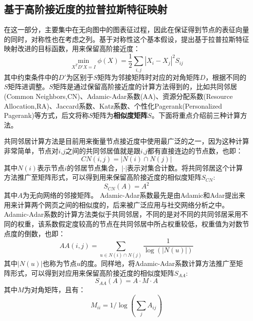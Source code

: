 \subsection{基于高阶接近度的拉普拉斯特征映射}
在这一部分，主要集中在无向图中的图表征过程，因此在保证得到节点的表征向量的同时，对称性也在考虑之列。基于对称性这个基本假设，提出基于拉普拉斯特征映射改进的目标函数，用来保留高阶接近度：
\begin{equation}\label{high_order_condition}
	\min_{X^TD'X=I} \phi(X) = \frac{1}{2}\sum_{i,j}|X_i - X_j|^2S_{ij} 
\end{equation}
其中约束条件中的$D'$为区别于$S$矩阵为邻接矩阵时对应的对角矩阵$D$，根据不同的$S$矩阵进调整。$S$矩阵是通过保留高阶接近度的计算方法得到的，比如共同邻居(Common Neighbors,CN)\cite{newman2001clustering}、Adamic-Adar系数(AA)\cite{adamic2003friends}、资源分配系数(Resource Allocation,RA)\cite{zhou2009predicting}、Jaccard系数、Katz系数、个性化Pagerank(Personalized Pagerank)\cite{wang2015link}等方式，后文将称$S$矩阵为\textbf{相似度矩阵$S$}。下面将重点介绍前三种计算方法。

共同邻居计算方法是目前用来衡量节点接近度中使用最广泛的之一，因为这种计算非常简单，节点对$i$,$j$之间的共同邻居值就是跟$i$,$j$都有直接连边的节点数，也即：
\begin{equation}
	CN(i,j) = |N(i) \cap N(j)|
\end{equation}
其中$N(i)$表示节点$i$的邻居节点集合，$|\cdot|$表示对集合计数。将共同邻居这个计算方法推广至矩阵形式，可以得到用来保留高阶接近度的相似度矩阵$S_{CN}$:
\begin{equation}
	S_{CN}(A) = A^2
\end{equation}
其中$A$为无向网络的邻接矩阵。
Adamic-Adar系数最先是由Adamic和Adar提出来用来计算两个网页之间的相似度的，后来被广泛应用与社交网络分析之中。Adamic-Adar系数的计算方法类似于共同邻居，不同的是对不同的共同邻居采用不同的权重，该系数假定度较高的节点在共同邻居中所占权重较低，权重值为对数节点度的倒数，也即：
\begin{equation}
	AA(i,j) = \sum_{u \in N(i)\cap N(j)} \frac{1}{\log(|N(u)|)}
\end{equation}
其中$|N(u)|$也称为节点$u$的度。同样地，将Adamic-Adar系数计算方法推广至矩阵形式，可以得到对应用来保留高阶接近度的相似度矩阵$S_{AA}$:
\begin{equation}
	S_{AA}(A) = A \cdot M \cdot A
\end{equation}
其中$M$为对角矩阵，且有：
\begin{equation}
M_{ii} = 1/\log(\sum_j{A_{ij}})
\end{equation}

